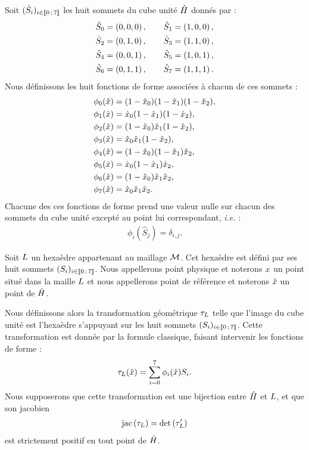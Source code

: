 Soit $(\hat{S}_i)_{i \in \lbrack\!\lbrack0\,;\,7\rbrack\!\rbrack}$ les huit sommets du cube unité
$\hat{H}$ donnés par :
\begin{equation}
	\begin{aligned}
		\hat{S}_0 &= \left(0,0,0\right) , \qquad
		\hat{S}_1 = \left(1,0,0\right) , \\
		\hat{S}_2 &= \left(0,1,0\right) , \qquad
		\hat{S}_3 = \left(1,1,0\right) , \\
		\hat{S}_4 &= \left(0,0,1\right) , \qquad
		\hat{S}_5 = \left(1,0,1\right) , \\
		\hat{S}_6 &= \left(0,1,1\right) , \qquad
		\hat{S}_7 = \left(1,1,1\right) .
	\end{aligned}
\end{equation}
Nous définissons les huit fonctions de forme associées à chacun de ces sommets :
\begin{equation}
	\begin{aligned}
		\phi_0(\hat{x}) &=
		(1 - \hat{x}_0)(1 - \hat{x}_1)(1 - \hat{x}_2) , \\
		\phi_1(\hat{x}) &=
		\hat{x}_0(1 - \hat{x}_1)(1 - \hat{x}_2) , \\
		\phi_2(\hat{x}) &=
		(1 - \hat{x}_0)\hat{x}_1(1 - \hat{x}_2) , \\
		\phi_3(\hat{x}) &=
		\hat{x}_0\hat{x}_1(1 - \hat{x}_2) , \\
		\phi_4(\hat{x}) &=
		(1 - \hat{x}_0)(1 - \hat{x}_1)\hat{x}_2 , \\
		\phi_5(\hat{x}) &=
		\hat{x}_0(1 - \hat{x}_1)\hat{x}_2 , \\
		\phi_6(\hat{x}) &=
		(1 - \hat{x}_0)\hat{x}_1\hat{x}_2 , \\
		\phi_7(\hat{x}) &=
		\hat{x}_0\hat{x}_1\hat{x}_2 .
	\end{aligned}
\end{equation}
Chacune des ces fonctions de forme prend une valeur nulle sur chacun des
sommets du cube unité excepté au point lui correspondant, \textit{i.e.} :
\begin{align}
	\phi_i(\hat{S}_j) = \delta_{i,j} .
\end{align}

Soit $L$ un hexaèdre appartenant au maillage $\mathcal{M}$. Cet hexaèdre est défini
par ses huit sommets $(S_i)_{i \in \lbrack\!\lbrack0\,;\,7\rbrack\!\rbrack}$. Nous appellerons
point physique et noterons $x$ un point situé dans la maille $L$ et nous
appellerons point de référence et noterons $\hat{x}$ un point de $\hat{H}$.


Nous définissons alors la transformation géométrique $\tau_{L}$ telle que
l’image du cube unité est l’hexaèdre s’appuyant sur les huit sommets
$(S_i)_{i \in \lbrack\!\lbrack0\,;\,7\rbrack\!\rbrack}$. Cette transformation est donnée par
la formule classique, faisant intervenir les fonctions de forme :
\begin{align}
	\tau_{L}(\hat{x}) = \sum_{i=0}^{7} \phi_i(\hat{x}) S_i .
\end{align}
Nous supposerons que cette transformation est une bijection entre $\hat{H}$
et $L$, et que son jacobien
\begin{align}
	\mathrm{jac}\left(\tau_{L}\right) = \det\left(\tau_{L}'\right)
\end{align}
est strictement positif en tout point de $\hat{H}$.

